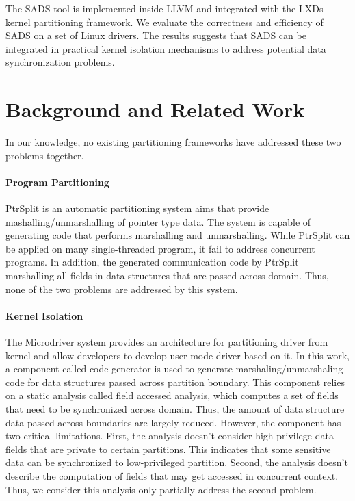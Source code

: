 \documentclass[pageno]{jpaper}
\begin{document}
The SADS tool is implemented inside LLVM and integrated with the LXDs kernel partitioning framework. We evaluate the correctness and efficiency of SADS on a set of Linux drivers. The results suggests that SADS can be integrated in practical kernel isolation mechanisms to address potential data synchronization problems.

\section{Background and Related Work}
In our knowledge, no existing partitioning frameworks have addressed these two problems together. 

\paragraph{Program Partitioning} PtrSplit is an automatic partitioning system aims that provide mashalling/unmarshalling of pointer type data. The system is capable of generating code that performs marshalling and unmarshalling. While PtrSplit can be applied on many single-threaded program, it fail to address concurrent programs. In addition, the generated communication code by PtrSplit marshalling all fields in data structures that are passed across domain. Thus, none of the two problems are addressed by this system.

\paragraph{Kernel Isolation} The Microdriver system \cite{ganapathy2008design} provides an architecture for partitioning driver from kernel and allow developers to develop user-mode driver based on it. In this work, a component called code generator is used to generate marshaling/unmarshaling code for data structures passed across partition boundary. This component relies on a static analysis called field accessed analysis, which computes a set of fields that need to be synchronized across domain. Thus, the amount of data structure data passed across boundaries are largely reduced. However, the component has two critical limitations. First, the analysis doesn't consider high-privilege data fields that are private to certain partitions. This indicates that some sensitive data can be synchronized to low-privileged partition. Second, the analysis doesn't describe the computation of fields that may get accessed in concurrent context. Thus, we consider this analysis only partially address the second problem. 
\end{document}

